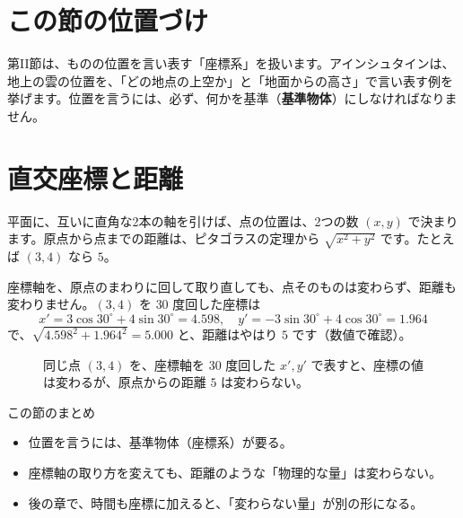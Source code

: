 \documentclass[a4paper,11pt,openany]{ltjsbook}
\begin{document}
\section{この節の位置づけ}

第II節は、ものの位置を言い表す「座標系」を扱います。アインシュタインは、地上の雲の位置を、「どの地点の上空か」と「地面からの高さ」で言い表す例を挙げます。位置を言うには、必ず、何かを基準（\textbf{基準物体}）にしなければなりません。

\section{直交座標と距離}

平面に、互いに直角な2本の軸を引けば、点の位置は、2つの数 $(x,y)$ で決まります。原点から点までの距離は、ピタゴラスの定理から $\sqrt{x^2+y^2}$ です。たとえば $(3,4)$ なら $5$。

座標軸を、原点のまわりに回して取り直しても、点そのものは変わらず、距離も変わりません。$(3,4)$ を $30$ 度回した座標は
\[
x'=3\cos30^\circ+4\sin30^\circ=4.598,\quad y'=-3\sin30^\circ+4\cos30^\circ=1.964
\]
で、$\sqrt{4.598^2+1.964^2}=5.000$ と、距離はやはり $5$ です（数値で確認）。

\begin{figure}[htbp]
\centering
{}
\caption{同じ点 $(3,4)$ を、座標軸を $30$ 度回した $x',y'$ で表すと、座標の値は変わるが、原点からの距離 $5$ は変わらない。}
\end{figure}

\begin{pointbox}{この節のまとめ}
\begin{itemize}[leftmargin=*]
\item 位置を言うには、基準物体（座標系）が要る。
\item 座標軸の取り方を変えても、距離のような「物理的な量」は変わらない。
\item 後の章で、時間も座標に加えると、「変わらない量」が別の形になる。
\end{itemize}
\end{pointbox}
\end{document}
